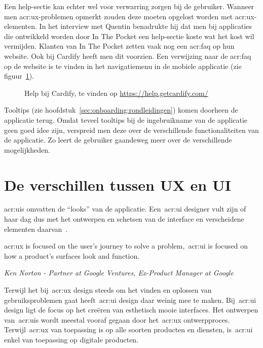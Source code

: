 Een help-sectie kan echter wel voor verwarring zorgen bij de gebruiker. Wanneer men \acrshort{acr:ux}-problemen opmerkt zouden deze moeten opgelost worden met \acrshort{acr:ux}-elementen. In het interview met Quentin benadrukte hij dat men bij applicaties die ontwikkeld worden door In The Pocket een help-sectie koste wat het kost wil vermijden. Klanten van In The Pocket zetten vaak nog een \acrshort{acr:faq} op hun website. Ook bij Cardify heeft men dit voorzien. Een verwijzing naar de \acrshort{acr:faq} op de website is te vinden in het navigatiemenu in de mobiele applicatie (zie figuur~\ref{fig:inapptraining:help}).

\begin{figure}
    \centering
    \qquad
    \caption[Voorbeeld help-sectie]{Help bij Cardify, te vinden op \url{https://help.getcardify.com/}}
    \label{fig:inapptraining:help}
\end{figure}

Tooltips (zie hoofdstuk~\ref{sec:onboarding:rondleidingen}) komen doorheen de applicatie terug. Omdat teveel tooltips bij de ingebruikname van de applicatie geen goed idee zijn, verspreid men deze over de verschillende functionaliteiten van de applicatie. Zo leert de gebruiker gaandeweg meer over de verschillende mogelijkheden.

\section{De verschillen tussen UX en UI}
\label{sec:ux-vs-ui}

\Glspl{acr:ui} omvatten de ``looks'' van de applicatie. Een~\acrshort{acr:ui} designer vult zijn of haar dag dus met het ontwerpen en schetsen van de interface en verscheidene elementen daarvan~\autocite{Lamprecht2019}.

\epigraph{\acrshort{acr:ux} is focused on the user’s journey to solve a problem,~\acrshort{acr:ui} is focused on how a product’s surfaces look and function.}{\textit{Ken Norton - Partner at Google Ventures, Ex-Product Manager at Google}}

Terwijl het bij~\acrshort{acr:ux} design steeds om het vinden en oplossen van gebruiksproblemen gaat heeft~\acrshort{acr:ui} design daar weinig mee te maken. Bij~\acrshort{acr:ui} design ligt de focus op het creëren van esthetisch mooie interfaces. Het ontwerpen van~\glspl{acr:ui} wordt meestal vooraf gegaan door het~\acrshort{acr:ux} ontwerpproces. Terwijl~\acrshort{acr:ux} van toepassing is op alle soorten producten en diensten, is~\acrshort{acr:ui} enkel van toepassing op digitale producten.

